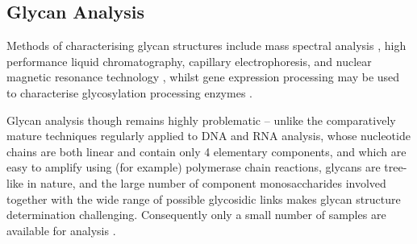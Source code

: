 \documentclass[12pt,a4paper]{article}
\begin{document}










\subsection{Glycan Analysis}
\label{sec:glycan_analysis}

Methods of characterising glycan structures include mass spectral analysis \citep{10.1371/journal.pcbi.1002813}, high performance liquid chromatography, capillary electrophoresis, and nuclear magnetic resonance technology \citep{von2004bioinformatics}, whilst gene expression processing may be used to characterise glycosylation processing enzymes \citep{10.1371/journal.pcbi.1002813}.

Glycan analysis though remains highly problematic -- unlike the comparatively mature techniques regularly applied to DNA and RNA analysis, whose nucleotide chains are both linear and contain only 4 elementary components, and which are easy to amplify using (for example) polymerase chain reactions, glycans are tree-like in nature, and the large number of component monosaccharides involved together with the wide range of possible glycosidic links makes glycan structure determination challenging. Consequently only a small number of samples are available for analysis \citep{doi:10.1093/bioinformatics/bti666}.
\end{document}
